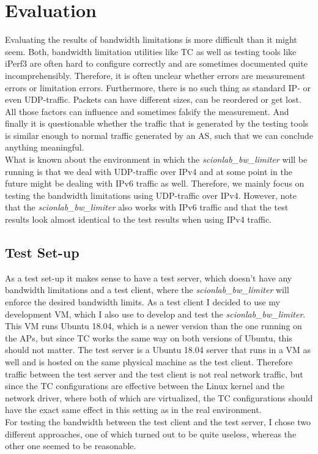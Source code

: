 \chapter{Evaluation}
Evaluating the results of bandwidth limitations is more difficult than it might seem. Both, bandwidth limitation utilities like \acs{TC} as well as testing tools like iPerf3 are often hard to configure correctly and are sometimes documented quite incomprehensibly. Therefore, it is often unclear whether errors are measurement errors or limitation errors. Furthermore, there is no such thing as standard \acs{IP}- or even \ac{UDP}-traffic. Packets can have different sizes, can be reordered or get lost. All those factors can influence and sometimes falsify the measurement. And finally it is questionable whether the traffic that is generated by the testing tools is similar enough to normal traffic generated by an \acs{AS}, such that we can conclude anything meaningful.
\\
What is known about the environment in which the \textit{scionlab\_bw\_limiter} will be running is that we deal with \acs{UDP}-traffic over \acs{IP}v4 and at some point in the future might be dealing with \acs{IP}v6 traffic as well. Therefore, we mainly focus on testing the bandwidth limitations using \acs{UDP}-traffic over \acs{IP}v4. However, note that the \textit{scionlab\_bw\_limiter} also works with \acs{IP}v6 traffic and that the test results look almost identical to the test results when using \acs{IP}v4 traffic.

\section{Test Set-up}

As a test set-up it makes sense to have a test server, which doesn't have any bandwidth limitations and a test client, where the \textit{scionlab\_bw\_limiter} will enforce the desired bandwidth limits. As a test client I decided to use my development \acs{VM}, which I also use to develop and test the \textit{scionlab\_bw\_limiter}. This \acs{VM} runs Ubuntu 18.04, which is a newer version than the one running on the \aclp{AP}, but since \acs{TC} works the same way on both versions of Ubuntu, this should not matter. The test server is a Ubuntu 18.04 server that runs in a \acs{VM} as well and is hosted on the same physical machine as the test client. Therefore traffic between the test server and the test client is not real network traffic, but since the \acs{TC} configurations are effective between the Linux kernel and the network driver, where both of which are virtualized, the \acs{TC} configurations should have the exact same effect in this setting as in the real environment.
\\
For testing the bandwidth between the test client and the test server, I chose two different approaches, one of which turned out to be quite useless, whereas the other one seemed to be reasonable.

